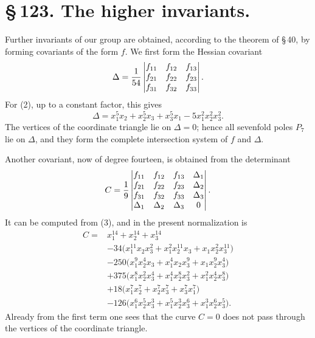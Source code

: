 \documentclass[11pt]{article}
\begin{document}
\section*{\S\,123. The higher invariants.}

Further invariants of our group are obtained, according to the theorem of \S\,40, by forming covariants of the form \(f\). We first form the Hessian covariant
\begin{equation}
\Delta={1\over54}
\begin{vmatrix}
f_{11}&f_{12}&f_{13}\\
f_{21}&f_{22}&f_{23}\\
f_{31}&f_{32}&f_{33}
\end{vmatrix}.
\end{equation}
For (2), up to a constant factor, this gives
\begin{equation}
\Delta=x_1^5x_2+x_2^5x_3+x_3^5x_1-5x_1^2x_2^2x_3^2.
\tag{3}
\end{equation}
The vertices of the coordinate triangle lie on \(\Delta=0\); hence all sevenfold poles \(P_7\) lie on \(\Delta\), and they form the complete intersection system of \(f\) and \(\Delta\).

Another covariant, now of degree fourteen, is obtained from the determinant
\begin{equation}
C={1\over9}
\begin{vmatrix}
f_{11}&f_{12}&f_{13}&\Delta_1\\
f_{21}&f_{22}&f_{23}&\Delta_2\\
f_{31}&f_{32}&f_{33}&\Delta_3\\
\Delta_1&\Delta_2&\Delta_3&0
\end{vmatrix}.
\end{equation}
It can be computed from (3), and in the present normalization is
\begin{equation}
\begin{aligned}
C={}&x_1^{14}+x_2^{14}+x_3^{14}\\
&-34\bigl(x_1^{11}x_2x_3^2+x_1^2x_2^{11}x_3+x_1x_2^2x_3^{11}\bigr)\\
&-250\bigl(x_1^9x_2^4x_3+x_1^4x_2x_3^9+x_1x_2^9x_3^4\bigr)\\
&+375\bigl(x_1^8x_2^2x_3^4+x_1^4x_2^8x_3^2+x_1^2x_2^4x_3^8\bigr)\\
&+18\bigl(x_1^7x_2^7+x_2^7x_3^7+x_3^7x_1^7\bigr)\\
&-126\bigl(x_1^6x_2^5x_3^3+x_1^5x_2^3x_3^6+x_1^3x_2^6x_3^5\bigr).
\end{aligned}
\tag{4}
\end{equation}
Already from the first term one sees that the curve \(C=0\) does not pass through the vertices of the coordinate triangle.
\end{document}
